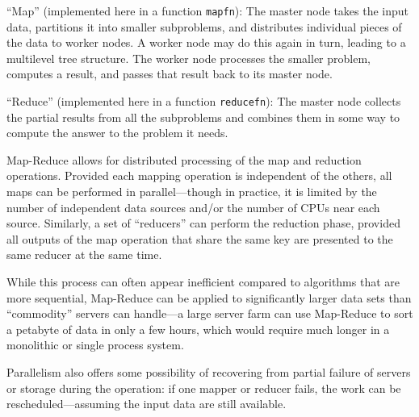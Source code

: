 \documentclass[justified, sixbynine]{tufte-book}
\def\ft{\small\tt}
\theoremstyle{plain}%
\newtheorem * {corollary}{Corollary}
\theoremstyle{definition}
\theoremstyle{remark}
\newtheorem * {remark}{Remark}
\newtheorem * {note}{Note}
\begin{document}
\begin{fullwidth}
``Map'' (implemented here in a function {\ft mapfn}): The master node takes the input data, partitions it into smaller subproblems, and distributes individual pieces of the data to worker nodes. A worker node may do this again in turn, leading to a multilevel tree structure. The worker node processes the smaller problem, computes a result, and passes that result back to its master node.

``Reduce'' (implemented here in a function {\ft reducefn}): The master node collects the partial results from all the subproblems and combines them in some way to compute the answer to the problem it needs.

Map-Reduce allows for distributed processing of the map and reduction operations. Provided each mapping operation is independent of the others, all maps can be performed in parallel---though in practice, it is limited by the number of independent data sources and/or the number of CPUs near each source. Similarly, a set of ``reducers'' can perform the reduction phase, provided all outputs of the map operation that share the same key are presented to the same reducer at the same time.

While this process can often appear inefficient compared to algorithms that are more sequential, Map-Reduce can be applied to significantly larger data sets than ``commodity'' servers can handle---a large server farm can use Map-Reduce to sort a petabyte of data in only a few hours, which would require much longer in a monolithic or single process system.

Parallelism also offers some possibility of recovering from partial failure of servers or storage during the operation: if one mapper or reducer fails, the work can be rescheduled---assuming the input data are still available.


\end{fullwidth}
\end{document}
